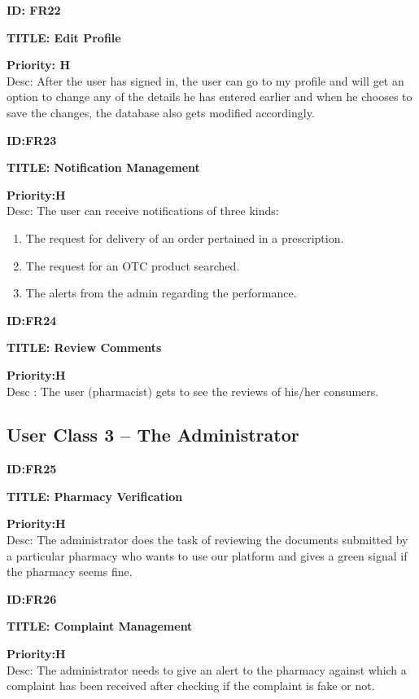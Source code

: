 \documentclass{scrreprt}
\begin{document}
\item \textbf{ID: FR22}
\item \textbf{TITLE: Edit Profile}
\item \textbf{Priority: H}\\
Desc:  After the user has signed in, the user can go to my profile and will get an option to change any of the details he has entered earlier  and when he chooses to save the changes, the database also gets modified accordingly.\\

\item \textbf{ID:FR23}
\item \textbf{TITLE: Notification Management}
\item \textbf{Priority:H}\\
Desc: The user can receive notifications of three kinds:  
\begin{enumerate}
\item	The request for delivery of an order pertained in a prescription.  
\item	The request for an OTC product searched.   
\item	The alerts from the admin regarding the performance.   
\end{enumerate}

\item \textbf{ID:FR24}
\item \textbf{TITLE: Review Comments}
\item \textbf{Priority:H}\\
Desc : The user (pharmacist) gets to see the reviews of his/her consumers.\\

\subsection{User Class 3 – The Administrator}
\item \textbf{ID:FR25}
\item \textbf{TITLE: Pharmacy Verification}
\item \textbf{Priority:H}\\
Desc: The administrator does the task of reviewing the documents submitted by a particular pharmacy who wants to use our platform and gives a green signal if the pharmacy seems fine.\\

\item \textbf{ID:FR26}
\item \textbf{TITLE: Complaint Management}
\item \textbf{Priority:H}\\
Desc: The administrator needs to give an alert to the pharmacy against which a complaint has been received after checking if the complaint is fake or not.\\
\end{document}
